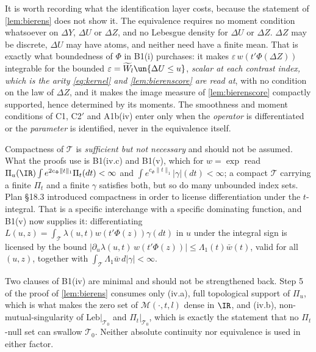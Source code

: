 \begin{remark}\label{rem:Tcond}
It is worth recording what the identification layer costs, because the statement of \cref{lem:bierens}
does not show it. The equivalence requires no moment condition whatsoever on $\Delta Y$, $\Delta U$
or $\Delta Z$, and no Lebesgue density for $\Delta U$ or $\Delta Z$. $\Delta Z$ may be discrete,
$\Delta U$ may have atoms, and neither need have a finite mean. That is exactly what boundedness of
$\Phi$ in B1(i) purchases: it makes $\varepsilon\,w(t'\Phi(\Delta Z))$ integrable for the bounded
$\varepsilon=\widetilde W_l\un\{\Delta U\le u\}$, \emph{scalar at each contrast index, which is the
arity \eqref{eq:kernel} and \cref{lem:bierenscore} are read at}, with no condition on the law of
$\Delta Z$, and it makes
the image measure of \cref{lem:bierenscore} compactly supported, hence determined by its moments. The
smoothness and moment conditions of C1, C2$'$ and A1b(iv) enter only when the \emph{operator} is
differentiated or the \emph{parameter} is identified, never in the equivalence itself.

Compactness of $\mathcal T$ is \emph{sufficient but not necessary} and should not be assumed. What the
proofs use is B1(iv.c) and B1(v), which for $w=\exp$ read
$\Pi_u(\IR)\int e^{2c_\Phi\|t\|_1}\Pi_t(dt)<\infty$ and $\int e^{c_\Phi\|t\|_1}|\gamma|(dt)<\infty$; a
compact $\mathcal T$ carrying a finite $\Pi_t$ and a finite $\gamma$ satisfies both, but so do many
unbounded index sets. Plan \S18.3 introduced compactness in order to license differentiation under the
$t$-integral. That is a specific interchange with a specific dominating function, and B1(v) now supplies
it: differentiating $L(u,z)=\int_{\mathcal T}\lambda(u,t)w(t'\Phi(z))\gamma(dt)$ in $u$ under the integral
sign is licensed by the bound $|\partial_u\lambda(u,t)\,w(t'\Phi(z))|\le\Lambda_1(t)\bar w(t)$, valid for
all $(u,z)$, together with $\int_{\mathcal T}\Lambda_1\bar w\,d|\gamma|<\infty$.

Two clauses of B1(iv) are minimal and should not be strengthened back. Step 5 of the proof of
\cref{lem:bierens} consumes only (iv.a), full topological support of $\Pi_u$, which is what makes the
zero set of $\mathcal M(\cdot,t,l)$ dense in $\IR$, and (iv.b), non-mutual-singularity of
$\mathrm{Leb}|_{\mathcal T_0}$ and $\Pi_t|_{\mathcal T_0}$, which is exactly the statement that no
$\Pi_t$-null set can swallow $\mathcal T_0$. Neither absolute continuity nor equivalence is used in
either factor.


\end{remark}
